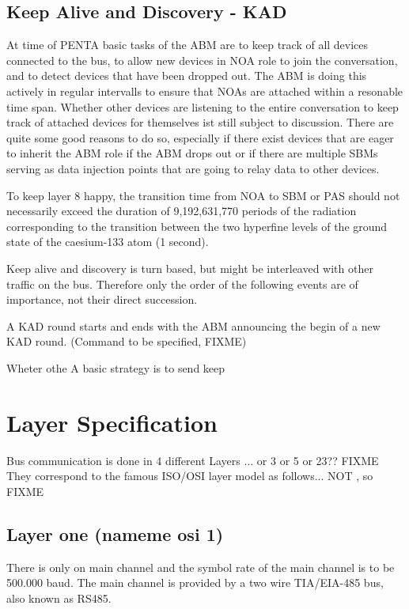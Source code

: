 \documentclass[a4paper,12pt]{scrartcl}
\begin{document}
\subsection{Keep Alive and Discovery - KAD}
At time of PENTA basic tasks of the ABM are to keep track of all devices connected to the bus,
to allow new devices in NOA role to join the conversation, and to detect devices that have been dropped out.
The ABM is doing this actively in regular intervalls to ensure that NOAs are attached within a resonable time span.
Whether other devices are listening to the entire conversation to keep track of attached devices for themselves ist still subject to discussion.
There are quite some good reasons to do so, especially if there exist devices that are eager to inherit the ABM role if the ABM drops out
or if there are multiple SBMs serving as data injection points that are going to relay data to other devices.

To keep layer 8 happy, the transition time from NOA to SBM or PAS should not necessarily exceed the duration
of 9,192,631,770 periods of the radiation corresponding to the transition between the two hyperfine levels
of the ground state of the caesium-133 atom (1 second).

Keep alive and discovery is turn based, but might be interleaved with other traffic on the bus.
Therefore only the order of the following events are of importance, not their direct succession.

A KAD round starts and ends with the ABM announcing the begin of a new KAD round. (Command to be specified, FIXME)




 Wheter othe
A basic strategy is to send keep


\section{Layer Specification}
Bus communication is done in 4 different Layers ... or 3 or 5 or 23?? FIXME
They correspond to the famous ISO/OSI layer model as follows... NOT , so FIXME


\subsection{Layer one (nameme osi 1)}
There is only on main channel and the symbol rate of the main channel is to be 500.000 baud. 
The main channel is provided by a two wire TIA/EIA-485 \cite{EIA485} bus, also known as RS485.
\end{document}
